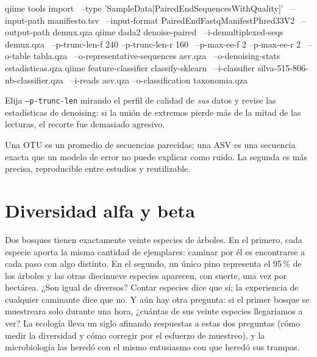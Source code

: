 \begin{consola}
qiime tools import \
  --type 'SampleData[PairedEndSequencesWithQuality]' \
  --input-path manifiesto.tsv \
  --input-format PairedEndFastqManifestPhred33V2 \
  --output-path demux.qza
qiime dada2 denoise-paired \
  --i-demultiplexed-seqs demux.qza \
  --p-trunc-len-f 240 --p-trunc-len-r 160 \
  --p-max-ee-f 2 --p-max-ee-r 2 \
  --o-table tabla.qza \
  --o-representative-sequences asv.qza \
  --o-denoising-stats estadisticas.qza
qiime feature-classifier classify-sklearn \
  --i-classifier silva-515-806-nb-classifier.qza \
  --i-reads asv.qza --o-classification taxonomia.qza
\end{consola}

Elija \texttt{--p-trunc-len} mirando el perfil de calidad de \emph{sus} datos y revise las estadísticas de denoising: si la unión de extremos pierde más de la mitad de las lecturas, el recorte fue demasiado agresivo.

\begin{ideaclave}
Una OTU es un promedio de secuencias parecidas; una ASV es una secuencia exacta que un modelo de error no puede explicar como ruido. La segunda es más precisa, reproducible entre estudios y reutilizable.
\end{ideaclave}

\section{Diversidad alfa y beta}\label{sec:14-diversidad}

\begin{intuicion}[Dos bosques con veinte especies]
Dos bosques tienen exactamente veinte especies de árboles. En el primero, cada especie aporta la misma cantidad de ejemplares: caminar por él es encontrarse a cada paso con algo distinto. En el segundo, un único pino representa el 95\,\% de los árboles y las otras diecinueve especies aparecen, con suerte, una vez por hectárea. ¿Son igual de diversos? Contar especies dice que sí; la experiencia de cualquier caminante dice que no. Y aún hay otra pregunta: si el primer bosque se muestreara solo durante una hora, ¿cuántas de sus veinte especies llegaríamos a ver? La ecología lleva un siglo afinando respuestas a estas dos preguntas (cómo medir la diversidad y cómo corregir por el esfuerzo de muestreo), y la microbiología las heredó con el mismo entusiasmo con que heredó sus trampas.
\end{intuicion}

